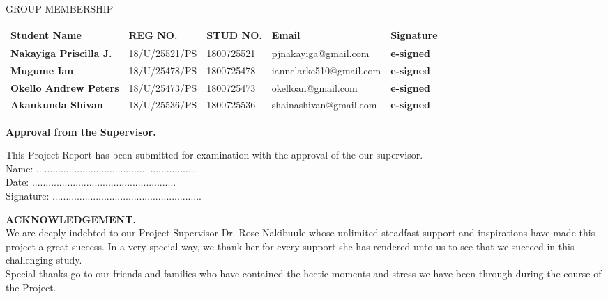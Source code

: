 \documentclass[11pt]{report}
\begin{document}
\begin{center}
	
GROUP MEMBERSHIP\\

{\begin{tabular}[htb]{|l|l|l|l|l|l|}\hline
 \textbf{Student Name} & \textbf{REG NO.} & \textbf{STUD NO.} & \textbf{Email} & \textbf{Signature}\\ \hline

\textbf{Nakayiga Priscilla J.} & {18/U/25521/PS}  &  {1800725521} & {pjnakayiga@gmail.com} & {\textbf{e-signed}}\\ \hline
\textbf{Mugume Ian} & {18/U/25478/PS}  &  {1800725478} & {iannclarke510@gmail.com} & {\textbf{e-signed}}\\ \hline
\textbf{Okello Andrew Peters} & {18/U/25473/PS}  &  {1800725473} & {okelloan@gmail.com} & {\textbf{e-signed}}\\ \hline
\textbf{Akankunda Shivan} & {18/U/25536/PS}  &  {1800725536} & {shainashivan@gmail.com} & {\textbf{e-signed}}\\ \hline

\end{tabular}}
\end{center}

\newpage
\textbf{Approval from the Supervisor.}

This Project Report has been submitted for examination with the approval of the our
supervisor.\\

Name: ...........................................................\\

Date: .....................................................\\

Signature:   .......................................................\\


\newpage

\textbf{ACKNOWLEDGEMENT.}\\

We are deeply indebted to our Project Supervisor Dr. Rose Nakibuule whose unlimited
steadfast support and inspirations have made this project a great success. In a very special way, we
thank her for every support she has rendered unto us to see that we succeed in this challenging
study.\\

Special thanks go to our friends and families who have contained the hectic moments and stress we
have been through during the course of the Project.\\
\end{document}
